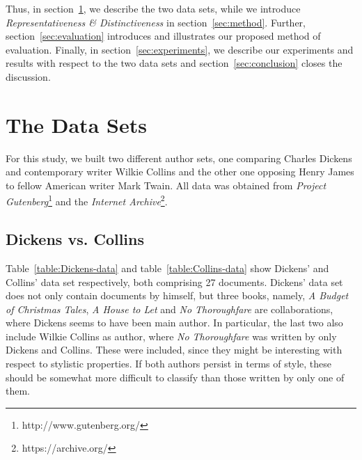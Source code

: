 \documentclass[a4paper,10pt,twoside,fleqn]{article}
\begin{document}
Thus, in section~\ref{sec:data}, we describe the two data sets, while we 
introduce \emph{Representativeness \& Distinctiveness} 
in section~\ref{sec:method}. Further, section~\ref{sec:evaluation}
introduces and illustrates our proposed method of evaluation. 
Finally, in section~\ref{sec:experiments}, we describe our experiments
and results with respect to the two data sets and section~\ref{sec:conclusion}
closes the discussion. 


\section{The Data Sets} \label{sec:data}
For this study, we built two different author sets, one comparing Charles Dickens
and contemporary writer Wilkie Collins and the other one opposing Henry James 
to fellow American writer Mark Twain. 
All data was obtained from \emph{Project Gutenberg}\footnote{http://www.gutenberg.org/}
and the \emph{Internet Archive}\footnote{https://archive.org/}.

\subsection{Dickens vs. Collins}
Table~\ref{table:Dickens-data} and table~\ref{table:Collins-data} show Dickens'
and Collins' data set respectively, both comprising 27 documents.
Dickens' data set does not only contain documents by himself, but three books, namely, 
\emph{A Budget of Christmas Tales}, \emph{A House to Let} and \emph{No Thoroughfare}
are collaborations, where Dickens seems to have been main author.
In particular, the last two also include Wilkie Collins as author, where 
\emph{No Thoroughfare} was written by only Dickens and Collins. 
These were included, since they might be interesting with respect to stylistic properties.
If both authors persist in terms of style, these should be somewhat more difficult 
to classify than those written by only one of them.  
\end{document}
